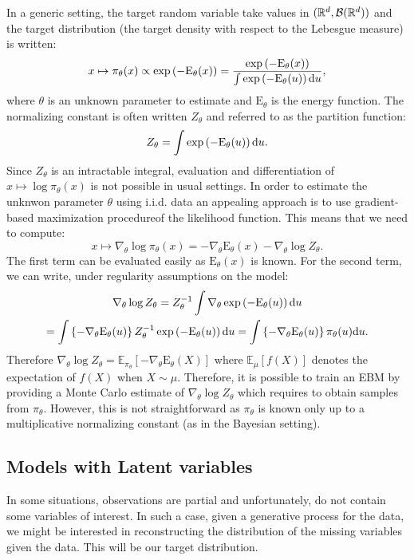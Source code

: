 \documentclass[english,graybox,envcountchap,envcountsame,sectrefs,shortlabels]{svmono}
\theoremstyle{style}
\begin{document}
In a generic setting, the target random variable take values in $(\mathbb{R}^d,\mathcal{B}(\mathbb{R}^d))$ and the target distribution (the target density with respect to the Lebesgue measure) is written:
$$
x\mapsto \pi_\theta(x) \propto \exp\left(-\mathrm{E}_\theta(x)\right) = \frac{\exp\left(-\mathrm{E}_\theta(x)\right)}{\int \exp\left(-\mathrm{E}_\theta(u)\right)\mathrm{d} u},
$$
where $\theta$ is an unknown parameter to estimate and $\mathrm{E}_\theta$ is the energy function. The normalizing constant is often written $Z_\theta$ and referred to as the partition function:
$$
Z_\theta = \int \exp\left(-\mathrm{E}_\theta(u)\right)\mathrm{d} u.
$$
Since $Z_\theta$ is an intractable integral, evaluation and
differentiation of $x\mapsto \log \pi_\theta(x)$ is not possible in usual settings. In order to estimate the unknwon parameter $\theta$ using i.i.d. data an appealing approach is to use gradient-based maximization procedureof the likelihood function. This means that we need to compute:
$$
x\mapsto \nabla_\theta \log\pi_\theta(x) = -\nabla_\theta\mathrm{E}_\theta(x) - \nabla_\theta \log Z_\theta.
$$
The first term can be evaluated easily as $\mathrm{E}_\theta(x)$ is known. For the second term, we can write, under regularity assumptions on the model:
\begin{multline*}
\nabla_\theta \log Z_\theta = Z_\theta^{-1} \int \nabla_\theta\exp\left(-\mathrm{E}_\theta(u)\right)\mathrm{d} u \\=  \int \left\{-\nabla_\theta \mathrm{E}_\theta(u)\right\}Z_\theta^{-1}\exp\left(-\mathrm{E}_\theta(u)\right)\mathrm{d} u = \int \left\{-\nabla_\theta \mathrm{E}_\theta(u)\right\}\pi_\theta(u)\mathrm{d} u .
\end{multline*}
Therefore $\nabla_\theta \log Z_\theta = \mathbb{E}_{\pi_\theta}[-\nabla_\theta \mathrm{E}_\theta(X)]$ where $\mathbb{E}_{\mu}[f(X)]$ denotes the expectation of $f(X)$ when $X\sim \mu$. Therefore, it is possible to train an EBM by providing a Monte Carlo estimate of $\nabla_\theta \log Z_\theta$ which requires to obtain samples from $\pi_\theta$. However, this is not straightforward as $\pi_\theta$ is known only up to a multiplicative normalizing constant (as in the Bayesian setting).

%


\subsection{Models with Latent variables}
In some situations, observations are partial and unfortunately, do not contain some variables of interest. In such a case, given a generative process for the data, we might be interested in reconstructing the distribution of the missing variables given the data. This will be our target distribution. 
\end{document}
